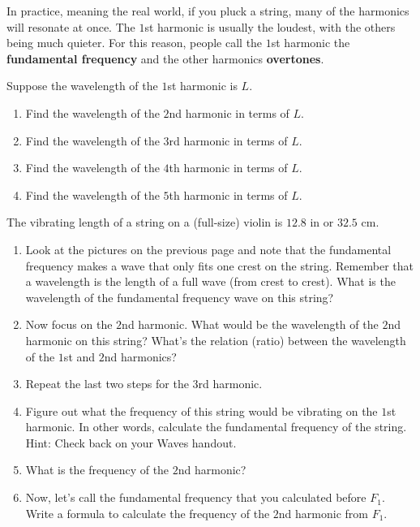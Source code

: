 \documentclass[12pt,noauthor,nooutcomes,]{ximera}
\begin{document}
In practice, meaning the real world, if you pluck a string, many of the harmonics will resonate at once. The $1$st harmonic is usually the loudest, with the others being much quieter. For this reason, people call the $1$st harmonic the \textbf{fundamental frequency} and the other harmonics \textbf{overtones}. 



\begin{question}
Suppose the wavelength of the $1$st harmonic is $L$.
\begin{enumerate}
\item Find the wavelength of the $2$nd harmonic in terms of $L$.
\item Find the wavelength of the $3$rd harmonic in terms of $L$.
\item Find the wavelength of the $4$th harmonic in terms of $L$.
\item Find the wavelength of the $5$th harmonic in terms of $L$.
\end{enumerate}
\end{question}

\begin{question}
The vibrating length of a string on a (full-size) violin is $12.8$ in or $32.5$ cm.
\begin{enumerate}
    \item Look at the pictures on the previous page and note that the fundamental frequency makes a wave that only fits one crest on the string. Remember that a wavelength is the length of a full wave (from crest to crest). What is the wavelength of the fundamental frequency wave on this string?
    \item Now focus on the $2$nd harmonic. What would be the wavelength of the $2$nd harmonic on this string? What's the relation (ratio) between the wavelength of the $1$st and $2$nd harmonics?
    \item Repeat the last two steps for the $3$rd harmonic.
    \item Figure out what the frequency of this string would be vibrating on the $1$st harmonic. In other words, calculate the fundamental frequency of the string. Hint: Check back on your Waves handout.
    \item What is the frequency of the $2$nd harmonic?
    \item Now, let's call the fundamental frequency that you calculated before $F_1$. Write a formula to calculate the frequency of the $2$nd harmonic from $F_1$. 
\end{enumerate}
\end{question}
\end{document}
